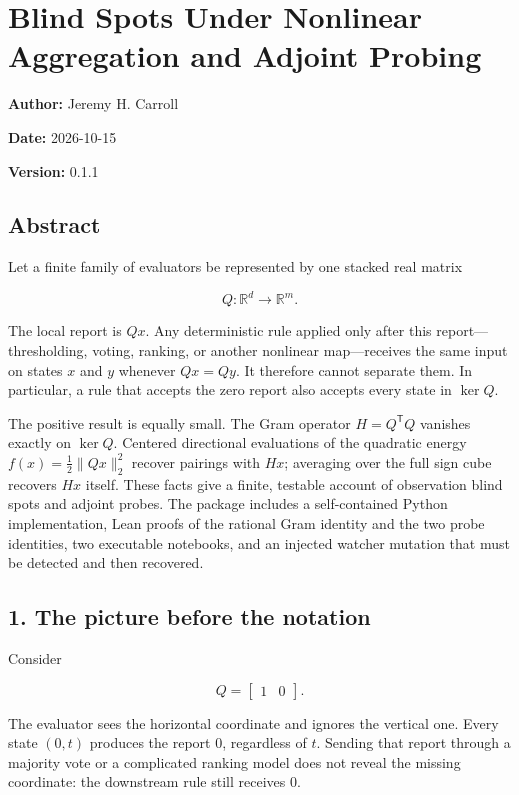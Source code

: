 \documentclass[
  11pt,
]{article}
\author{}
\date{2026-10-15}
\theoremstyle{plain}
\theoremstyle{definition}\newtheorem{definition}[theorem]{Definition}
\theoremstyle{remark}\newtheorem*{remark}{Remark}
\begin{document}
\section{Blind Spots Under Nonlinear Aggregation and Adjoint Probing}\label{blind-spots-under-nonlinear-aggregation-and-adjoint-probing}

\textbf{Author:} Jeremy H. Carroll

\textbf{Date:} 2026-10-15

\textbf{Version:} 0.1.1

\subsection{Abstract}\label{abstract}

Let a finite family of evaluators be represented by one stacked real matrix

\[
Q:\mathbb{R}^{d}\longrightarrow\mathbb{R}^{m}.
\]

The local report is \(Qx\). Any deterministic rule applied only after this
report---thresholding, voting, ranking, or another nonlinear map---receives the
same input on states \(x\) and \(y\) whenever \(Qx=Qy\). It therefore cannot
separate them. In particular, a rule that accepts the zero report also accepts
every state in \(\ker Q\).

The positive result is equally small. The Gram operator
\(H=Q^{\mathsf T}Q\) vanishes exactly on \(\ker Q\). Centered directional
evaluations of the quadratic energy \(f(x)=\tfrac12\lVert Qx\rVert_2^2\)
recover pairings with \(Hx\); averaging over the full sign cube recovers
\(Hx\) itself. These facts give a finite, testable account of observation
blind spots and adjoint probes. The package includes a self-contained Python
implementation, Lean proofs of the rational Gram identity and the two probe
identities, two executable notebooks, and an injected watcher mutation that
must be detected and then recovered.

\subsection{1. The picture before the notation}\label{the-picture-before-the-notation}

Consider

\[
Q=\begin{bmatrix}1&0\end{bmatrix}.
\]

The evaluator sees the horizontal coordinate and ignores the vertical one.
Every state \((0,t)\) produces the report \(0\), regardless of \(t\). Sending
that report through a majority vote or a complicated ranking model does not
reveal the missing coordinate: the downstream rule still receives \(0\).
\end{document}
